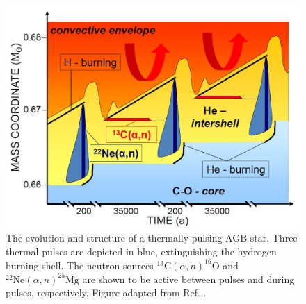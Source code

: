 \begin{figure}[t]
\centering
\includegraphics[width=6.5in]{Chapter-1/figs/sProcess_AGB.JPG}
\caption{\label{fig:AGB_Structure}The evolution and structure of a thermally pulsing AGB star. Three thermal pulses are depicted in blue, extinguishing the hydrogen burning shell. The neutron sources $^{13}\mathrm{C}(\alpha,n)^{16}\mathrm{O}$ and $^{22}\mathrm{Ne}(\alpha,n)^{25}\mathrm{Mg}$ are shown to be active between pulses and during pulses, respectively. Figure adapted from Ref. \cite{Reifarth2014}.}
\end{figure}

